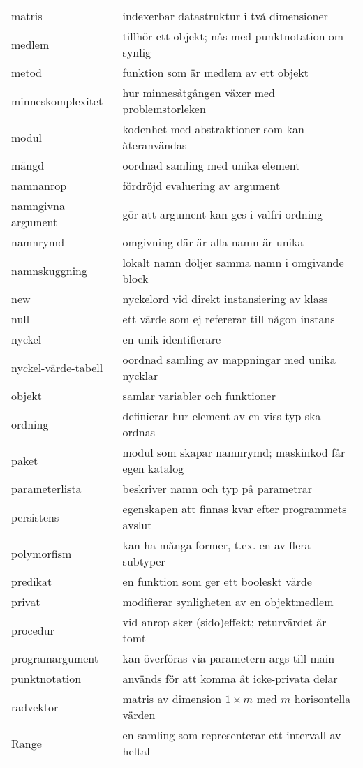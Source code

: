 \begin{tabular}{l|l}
matris & indexerbar datastruktur i två dimensioner \\
medlem & tillhör ett objekt; nås med punktnotation om synlig \\
metod & funktion som är medlem av ett objekt \\
minneskomplexitet & hur minnesåtgången växer med problemstorleken \\
modul & kodenhet med abstraktioner som kan återanvändas \\
mängd & oordnad samling med unika element \\
namnanrop & fördröjd evaluering av argument \\
namngivna argument & gör att argument kan ges i valfri ordning \\
namnrymd & omgivning där är alla namn är unika \\
namnskuggning & lokalt namn döljer samma namn i omgivande block \\
new & nyckelord vid direkt instansiering av klass \\
null & ett värde som ej refererar till någon instans \\
nyckel & en unik identifierare \\
nyckel-värde-tabell & oordnad samling av mappningar med unika nycklar \\
objekt & samlar variabler och funktioner \\
ordning & definierar hur element av en viss typ ska ordnas \\
paket & modul som skapar namnrymd; maskinkod får egen katalog \\
parameterlista & beskriver namn och typ på parametrar \\
persistens & egenskapen att finnas kvar efter programmets avslut \\
polymorfism & kan ha många former, t.ex. en av flera subtyper \\
predikat & en funktion som ger ett booleskt värde \\
privat & modifierar synligheten av en objektmedlem \\
procedur & vid anrop sker (sido)effekt; returvärdet är tomt \\
programargument & kan överföras via parametern args till main \\
punktnotation & används för att komma åt icke-privata delar \\
radvektor & matris av dimension $1\times{}m$ med $m$ horisontella värden \\
Range & en samling som representerar ett intervall av heltal \\

\end{tabular}
